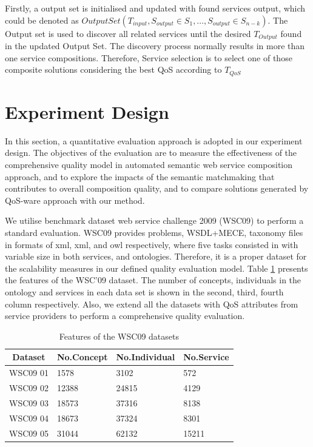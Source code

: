 \documentclass{llncs}
\begin{document}
Firstly, a output set is initialised and updated with found services output, which could be denoted as $Output Set(T_{input}, S_{output} \in S_1,...,S_{output} \in S_{n-k})$. The Output set is used to discover all related services until the desired $T_{Output}$ found in the updated Output Set. The discovery process normally results in more than one service compositions. Therefore, Service selection is to select one of those composite solutions considering the best QoS according to $T_{QoS}$

\section{Experiment Design}\label{experiment_design}
In this section, a quantitative evaluation approach is adopted in our experiment design. The objectives of the evaluation are to measure the effectiveness of the comprehensive quality model in automated semantic web service composition approach, and to explore the impacts of the semantic matchmaking that contributes to overall composition quality, and to compare solutions generated by QoS-ware approach with our method.

We utilise benchmark dataset web service challenge 2009 (WSC09) \cite{kona2009wsc} to perform a standard evaluation. WSC09 provides problems,  WSDL+MECE, taxonomy files in formats of xml, xml, and owl respectively, where five tasks consisted in with variable size in both services, and ontologies. Therefore, it is a proper dataset for the scalability measures in our defined quality evaluation model. Table \ref{wsc09datasetTable} presents the features of the WSC’09 dataset. The number of concepts, individuals in the ontology and services in each data set is shown in the second, third, fourth column respectively. Also, we extend all the datasets with QoS attributes from service providers to perform a comprehensive quality evaluation. 
\begin{table}[]
\centering
\caption{Features of the WSC09 datasets}
\label{wsc09datasetTable}
\begin{tabular}{|l|l|l|l|}
\hline
\multicolumn{1}{|c|}{Dataset} & No.Concept & No.Individual & No.Service \\ \hline
WSC09 01                     & 1578       &3102           &572      \\ \hline
WSC09 02                     & 12388      &24815          &4129      \\ \hline
WSC09 03                     & 18573      &37316          &8138      \\ \hline
WSC09 04                     & 18673      &37324          &8301      \\ \hline
WSC09 05                     & 31044      &62132          &15211    \\ \hline
\end{tabular}
\end{table}
\end{document}
